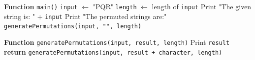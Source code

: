 \begin{algorithm}[H]
\caption{Generate Permutations with Repetition}
\begin{algorithmic}[1]
\STATE \textbf{Function} \texttt{main()}
\STATE \hspace{1em} \texttt{input} $\gets$ "PQR"
\STATE \hspace{1em} \texttt{length} $\gets$ length of \texttt{input}
\STATE \hspace{1em} Print "The given string is: " + \texttt{input}
\STATE \hspace{1em} Print "The permuted strings are:"
\STATE \hspace{1em} \texttt{generatePermutations(input, "", length)}

\STATE

\STATE \textbf{Function} \texttt{generatePermutations(input, result, length)}
    \STATE Print \texttt{result}
    \STATE \textbf{return}
\ENDIF
{}
    \STATE \texttt{generatePermutations(input, result + character, length)}
\ENDFOR
\end{algorithmic}
\end{algorithm}